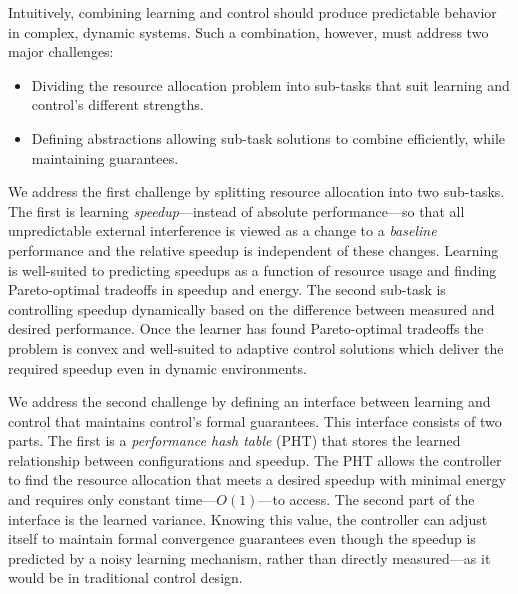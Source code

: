 Intuitively, combining learning and control should produce predictable
behavior in complex, dynamic systems.  Such a combination, however,
must address two major challenges:
\begin{itemize}[leftmargin=1em]
\item Dividing the resource allocation problem into sub-tasks that
  suit learning and control's different strengths.
\item Defining abstractions allowing sub-task solutions to combine
  efficiently, while maintaining guarantees.
\end{itemize}

We address the first challenge by splitting resource allocation into
two sub-tasks.  The first is learning \emph{speedup}---instead of
absolute performance---so that all unpredictable external interference
is viewed as a change to a \emph{baseline} performance and the
relative speedup is independent of these changes.  Learning is
well-suited to predicting speedups as a function of resource usage and
finding Pareto-optimal tradeoffs in speedup and energy.  The second
sub-task is controlling speedup dynamically based on the difference
between measured and desired performance.  Once the learner has found
Pareto-optimal tradeoffs the problem is convex and well-suited to
adaptive control solutions which deliver the required speedup even in
dynamic environments.

We address the second challenge by defining an interface between
learning and control that maintains control's formal guarantees.  This
interface consists of two parts.  The first is a \emph{performance
  hash table} (PHT) that stores the learned relationship between
configurations and speedup.  The PHT allows the controller to find the
resource allocation that meets a desired speedup with minimal energy
and requires only constant time---$O(1)$---to access.  The second part
of the interface is the learned variance.  Knowing this value, the
controller can adjust itself to maintain formal convergence guarantees
even though the speedup is predicted by a noisy learning mechanism,
rather than directly measured---as it would be in traditional control
design.

